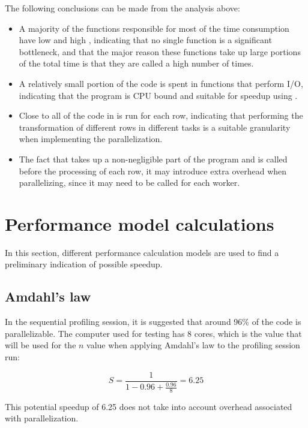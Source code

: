 The following conclusions can be made from the analysis above:

\begin{itemize}
  \item A majority of the functions responsible for most of the time consumption have low  and high , indicating that no single function is
    a significant bottleneck, and that the major reason these functions take up large portions of the total time is that they are called a high number of times.
  \item A relatively small portion of the code is spent in functions that perform I/O, indicating that the program is CPU bound and suitable for speedup using
    .
  \item Close to all of the code in  is run for each row, indicating that performing the transformation of different rows in different tasks is a
    suitable granularity when implementing the parallelization.
  \item The fact that  takes up a non-negligible part of the program and is called before the processing of each row, it may introduce extra overhead
    when parallelizing, since it may need to be called for each worker.
\end{itemize}

\section{Performance model calculations} \label{performance_model_calculations}
In this section, different performance calculation models are used to find a preliminary indication of possible speedup.

\subsection{Amdahl's law}
In the sequential profiling session, it is suggested that around 96\% of the code is parallelizable. The computer used for testing has 8 cores,
which is the value that will be used for the $n$ value when applying Amdahl's law to the profiling session run:

\begin{displaymath}
  S = \frac{1}{1 - 0.96 + \frac{0.96}{8}} = 6.25
  \label{fig:amdahl_calculation}
\end{displaymath}

\noindent This potential speedup of 6.25 does not take into account overhead associated with parallelization.

